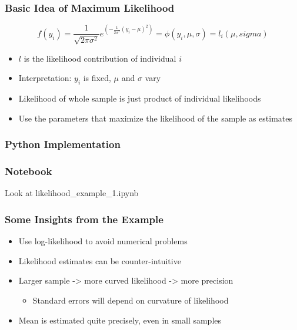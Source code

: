 \documentclass[11pt]{beamer}
\begin{document}
\begin{frame}[c]\frametitle{Basic Idea of Maximum Likelihood}
    \begin{equation}
        f(y_i) = \frac{1}{\sqrt{2\pi\sigma^2}} e^{\left(-\frac{1}{2 \sigma^2}(y_i - \mu)^2\right)} = \phi(y_i, \mu, \sigma) = l_i(\mu, sigma)
    \end{equation}
    \begin{itemize}
        \item $l$ is the likelihood contribution of individual $i$
        \item Interpretation: $y_i$ is fixed, $\mu$ and $\sigma$ vary
        \item Likelihood of whole sample is just product of individual likelihoods
        \item Use the parameters that maximize the likelihood of the sample as estimates
    \end{itemize}
\end{frame}


%
%
%
%



\begin{frame}[c]\frametitle{Python Implementation}
    \exampleCode
\end{frame}

\begin{frame}[c]\frametitle{Notebook}
    Look at likelihood\_example\_1.ipynb
\end{frame}


\begin{frame}[c]\frametitle{Some Insights from the Example}
    \begin{itemize}

        \item Use log-likelihood to avoid numerical problems
        \item Likelihood estimates can be counter-intuitive
        \item Larger sample -> more curved likelihood -> more precision
        \begin{itemize}
            \item Standard errors will depend on curvature of likelihood
        \end{itemize}
        \item Mean is estimated quite precisely, even in small samples
    \end{itemize}
\end{frame}
\end{document}
